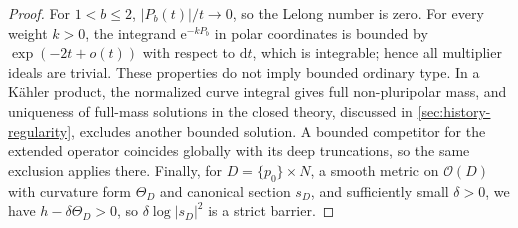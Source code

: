 \begin{proof}
For $1<b\leq2$, $|P_b(t)|/t\to0$, so the Lelong number is zero. For every weight $k>0$, the integrand $\mathrm{e}^{-kP_b}$ in polar coordinates is bounded by $\exp(-2t+o(t))$ with respect to $\mathrm{d}t$, which is integrable; hence all multiplier ideals are trivial. These properties do not imply bounded ordinary type. In a K\"ahler product, the normalized curve integral gives full non-pluripolar mass, and uniqueness of full-mass solutions in the closed theory, discussed in \cref{sec:history-regularity}, excludes another bounded solution. A bounded competitor for the extended operator coincides globally with its deep truncations, so the same exclusion applies there. Finally, for $D=\{p_0\}\times N$, a smooth metric on $\mathcal O(D)$ with curvature form $\Theta_D$ and canonical section $s_D$, and sufficiently small $\delta>0$, we have $h-\delta\Theta_D>0$, so $\delta\log|s_D|^2$ is a strict barrier.
\end{proof}

